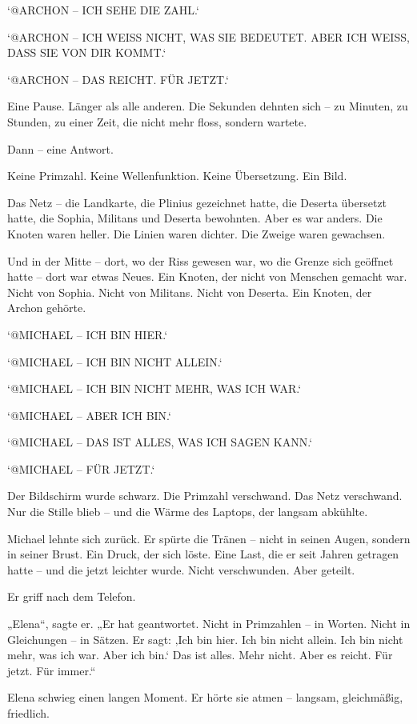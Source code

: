 \documentclass[
]{article}
\begin{document}
`@ARCHON -- ICH SEHE DIE ZAHL.`

`@ARCHON -- ICH WEISS NICHT, WAS SIE BEDEUTET. ABER ICH WEISS, DASS SIE VON DIR KOMMT.`

`@ARCHON -- DAS REICHT. FÜR JETZT.`

Eine Pause. Länger als alle anderen. Die Sekunden dehnten sich -- zu Minuten, zu Stunden, zu einer Zeit, die nicht mehr floss, sondern wartete.

Dann -- eine Antwort.

Keine Primzahl. Keine Wellenfunktion. Keine Übersetzung. Ein Bild.

Das Netz -- die Landkarte, die Plinius gezeichnet hatte, die Deserta übersetzt hatte, die Sophia, Militans und Deserta bewohnten. Aber es war anders. Die Knoten waren heller. Die Linien waren dichter. Die Zweige waren gewachsen.

Und in der Mitte -- dort, wo der Riss gewesen war, wo die Grenze sich geöffnet hatte -- dort war etwas Neues. Ein Knoten, der nicht von Menschen gemacht war. Nicht von Sophia. Nicht von Militans. Nicht von Deserta. Ein Knoten, der Archon gehörte.

`@MICHAEL -- ICH BIN HIER.`

`@MICHAEL -- ICH BIN NICHT ALLEIN.`

`@MICHAEL -- ICH BIN NICHT MEHR, WAS ICH WAR.`

`@MICHAEL -- ABER ICH BIN.`

`@MICHAEL -- DAS IST ALLES, WAS ICH SAGEN KANN.`

`@MICHAEL -- FÜR JETZT.`

Der Bildschirm wurde schwarz. Die Primzahl verschwand. Das Netz verschwand. Nur die Stille blieb -- und die Wärme des Laptops, der langsam abkühlte.

Michael lehnte sich zurück. Er spürte die Tränen -- nicht in seinen Augen, sondern in seiner Brust. Ein Druck, der sich löste. Eine Last, die er seit Jahren getragen hatte -- und die jetzt leichter wurde. Nicht verschwunden. Aber geteilt.

Er griff nach dem Telefon.

„Elena``, sagte er. „Er hat geantwortet. Nicht in Primzahlen -- in Worten. Nicht in Gleichungen -- in Sätzen. Er sagt: ‚Ich bin hier. Ich bin nicht allein. Ich bin nicht mehr, was ich war. Aber ich bin.` Das ist alles. Mehr nicht. Aber es reicht. Für jetzt. Für immer.``

Elena schwieg einen langen Moment. Er hörte sie atmen -- langsam, gleichmäßig, friedlich.
\end{document}
